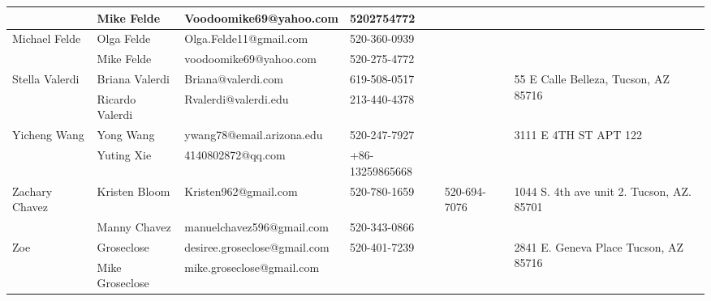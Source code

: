\documentclass[landscape]{article}\usepackage[]{graphicx}\usepackage[]{color}
\begin{document}
\begin{longtable}{|p{100pt}|p{100pt}|p{140pt}|p{60pt}|p{64pt}|p{120pt}|}
 & Mike Felde & Voodoomike69@yahoo.com & 5202754772 &  & \\
\hline
\multirow{2}{100pt}{Michael Felde} & Olga Felde & Olga.Felde11@gmail.com & 520-360-0939 &  & \multirow{2}{120pt}{} \\
 & Mike Felde & voodoomike69@yahoo.com & 520-275-4772 &  & \\
\hline
\multirow{2}{100pt}{Stella Valerdi} & Briana Valerdi & Briana@valerdi.com & 619-508-0517 &  & \multirow{2}{120pt}{55 E Calle Belleza, Tucson, AZ 85716} \\
 & Ricardo Valerdi & Rvalerdi@valerdi.edu & 213-440-4378 &  & \\
\hline
\multirow{2}{100pt}{Yicheng Wang} & Yong Wang & ywang78@email.arizona.edu & 520-247-7927 &  & \multirow{2}{120pt}{3111 E 4TH ST APT 122} \\
 & Yuting Xie & 4140802872@qq.com & +86-13259865668 &  & \\
\hline
\multirow{2}{100pt}{Zachary Chavez} & Kristen Bloom & Kristen962@gmail.com & 520-780-1659 & 520-694-7076 & \multirow{2}{120pt}{1044 S. 4th ave unit 2. Tucson, AZ. 85701} \\
 & Manny Chavez & manuelchavez596@gmail.com & 520-343-0866 &  & \\
\hline
\multirow{2}{100pt}{Zoe} & Groseclose & desiree.groseclose@gmail.com & 520-401-7239 &  & \multirow{2}{120pt}{2841 E. Geneva Place Tucson, AZ 85716} \\
 & Mike Groseclose & mike.groseclose@gmail.com &  &  & \\
\hline
\end{longtable}
\newpage
\end{document}
